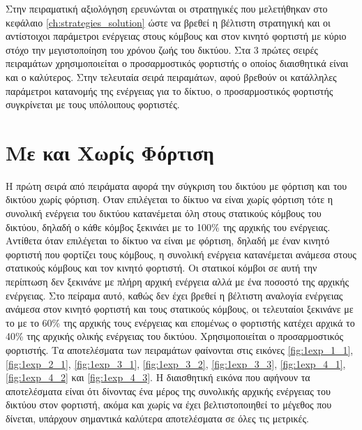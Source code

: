 Στην πειραματική αξιολόγηση ερευνώνται οι στρατηγικές που μελετήθηκαν στο κεφάλαιο \ref{ch:strategies_solution} ώστε να βρεθεί η βέλτιστη στρατηγική και οι
αντίστοιχοι παράμετροι ενέργειας στους κόμβους και στον κινητό φορτιστή με κύριο στόχο την μεγιστοποίηση του χρόνου ζωής του δικτύου. Στα 3 πρώτες σειρές πειραμάτων
χρησιμοποιείται ο προσαρμοστικός φορτιστής ο οποίος διαισθητικά είναι και ο καλύτερος. Στην τελευταία σειρά πειραμάτων, αφού βρεθούν οι κατάλληλες παράμετροι
κατανομής της ενέργειας για το δίκτυο, ο προσαρμοστικός φορτιστής συγκρίνεται με τους υπόλοιπους φορτιστές.

\section{Με και Χωρίς Φόρτιση}\label{sc:result1}
Η πρώτη σειρά από πειράματα αφορά την σύγκριση του δικτύου με φόρτιση και του δικτύου χωρίς φόρτιση. Όταν επιλέγεται το δίκτυο να είναι χωρίς φόρτιση τότε η συνολική
ενέργεια του δικτύου κατανέμεται όλη στους στατικούς κόμβους του δικτύου, δηλαδή ο κάθε κόμβος ξεκινάει με το 100\% της αρχικής του ενέργειας. Αντίθετα όταν
επιλέγεται το δίκτυο να είναι με φόρτιση, δηλαδή με έναν κινητό φορτιστή που φορτίζει τους κόμβους, η συνολική ενέργεια κατανέμεται ανάμεσα στους στατικούς κόμβους
και τον κινητό φορτιστή. Οι στατικοί κόμβοι σε αυτή την περίπτωση δεν ξεκινάνε με πλήρη αρχική ενέργεια αλλά με ένα ποσοστό της αρχικής ενέργειας. Στο πείραμα αυτό,
καθώς δεν έχει βρεθεί η βέλτιστη αναλογία ενέργειας ανάμεσα στον κινητό φορτιστή και τους στατικούς κόμβους, οι τελευταίοι ξεκινάνε με το με το 60\% της αρχικής τους
ενέργειας και επομένως ο φορτιστής κατέχει αρχικά το 40\% της αρχικής ολικής ενέργειας του δικτύου. Χρησιμοποιείται ο προσαρμοστικός φορτιστής. Τα αποτελέσματα των
πειραμάτων φαίνονται στις εικόνες \ref{fig:1exp_1_1}, \ref{fig:1exp_2_1}, \ref{fig:1exp_3_1}, \ref{fig:1exp_3_2}, \ref{fig:1exp_3_3}, \ref{fig:1exp_4_1},
\ref{fig:1exp_4_2} και \ref{fig:1exp_4_3}. Η διαισθητική εικόνα που αφήνουν τα αποτελέσματα είναι ότι δίνοντας ένα μέρος της συνολικής αρχικής ενέργειας του δικτύου
στον φορτιστή, ακόμα και χωρίς να έχει βελτιστοποιηθεί το μέγεθος που δίνεται, υπάρχουν σημαντικά καλύτερα αποτελέσματα σε όλες τις μετρικές.



